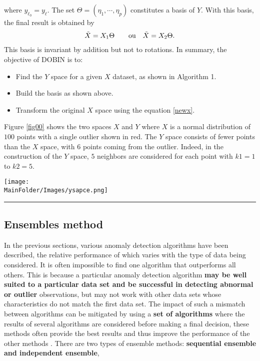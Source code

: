 where $y_{\ell_0}=y_\ell$. The set $\Theta=(\eta_1,\cdots,\eta_p)$ constitutes a basis of $Y$.  With this basis, the final result is obtained by 
\begin{align}\label{newx}
\Tilde{X}=X_1\Theta \qquad\text{ou}\quad \tilde{X}=X_2\Theta.
\end{align}
This basis is invariant by addition but not to rotations. In summary, 
 the objective of DOBIN is to:
 \begin{itemize}
 \item Find the $Y$ space for a given $X$ dataset, as shown in Algorithm 1.
 \item Build the basis as shown above.
 \item Transform the original $X$ space using the equation \eqref{newx}. 
 \end{itemize}
 Figure \ref{fig00} shows the two spaces $X$ and $Y$ where $X$ is a normal distribution 
 of $100$  points with a single outlier shown in red. The $Y$ space consists of fewer points than the $X$ space, with $6$ points coming from the outlier. Indeed, in the construction of the $Y$ space, $5$ neighbors are considered for each point with $k1 =1$ to $k2 = 5$.
 \begin{figure*}[ht]
    \centering
     \texttt{[image: \\MainFolder/Images/ysapce.png]}
    \caption{The $X$ and $Y$ spaces. The $X$ space in (a) and the associated $Y$ space in (b) with $q = 0.95$. The dot colored red in the $X$ space gives rise to 6 dots, which are colored red in the $Y$ space (source \cite{A6}).}\hrule
    \label{fig00}
\end{figure*}

%
\subsection{Ensembles method}
%
%
In the previous sections, various anomaly detection algorithms have been described, the relative performance of which varies with the type of data being considered. It is often impossible to find one algorithm that outperforms all others. This is because a particular anomaly detection algorithm \textbf{may be well suited to a particular data set and be successful in detecting abnormal or outlier} observations, but may not work with other data sets whose characteristics do not match the first data set. The impact of such a mismatch between algorithms can be mitigated by using a \textbf{set of algorithms} where the results of several algorithms are considered before making a final decision, these methods often provide the best results and thus improve the performance of the other methods \cite{A10}. There are two types of ensemble methods: \textbf{sequential ensemble  and independent ensemble}, \newl
